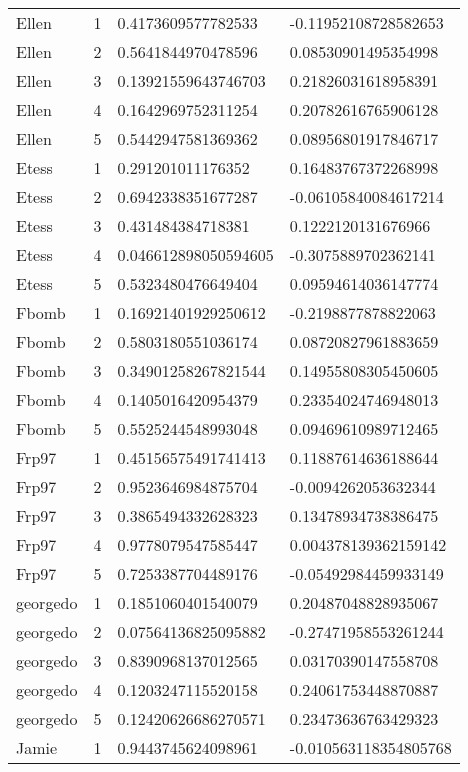 \begin{longtable}{@{}lcll@{}}
      Ellen & 1 & 0.4173609577782533 & -0.11952108728582653 \\
      Ellen & 2 & 0.5641844970478596 & 0.08530901495354998 \\
      Ellen & 3 & 0.13921559643746703 & 0.21826031618958391 \\
      Ellen & 4 & 0.1642969752311254 & 0.20782616765906128 \\
      Ellen & 5 & 0.5442947581369362 & 0.08956801917846717 \\
      Etess & 1 & 0.291201011176352 & 0.16483767372268998 \\
      Etess & 2 & 0.6942338351677287 & -0.06105840084617214 \\
      Etess & 3 & 0.431484384718381 & 0.1222120131676966 \\
      Etess & 4 & 0.046612898050594605 & -0.3075889702362141 \\
      Etess & 5 & 0.5323480476649404 & 0.09594614036147774 \\
      Fbomb & 1 & 0.16921401929250612 & -0.2198877878822063 \\
      Fbomb & 2 & 0.5803180551036174 & 0.08720827961883659 \\
      Fbomb & 3 & 0.34901258267821544 & 0.14955808305450605 \\
      Fbomb & 4 & 0.1405016420954379 & 0.23354024746948013 \\
      Fbomb & 5 & 0.5525244548993048 & 0.09469610989712465 \\
      Frp97 & 1 & 0.45156575491741413 & 0.11887614636188644 \\
      Frp97 & 2 & 0.9523646984875704 & -0.0094262053632344 \\
      Frp97 & 3 & 0.3865494332628323 & 0.13478934738386475 \\
      Frp97 & 4 & 0.9778079547585447 & 0.004378139362159142 \\
      Frp97 & 5 & 0.7253387704489176 & -0.05492984459933149 \\
      georgedo & 1 & 0.1851060401540079 & 0.20487048828935067 \\
      georgedo & 2 & 0.07564136825095882 & -0.27471958553261244 \\
      georgedo & 3 & 0.8390968137012565 & 0.03170390147558708 \\
      georgedo & 4 & 0.1203247115520158 & 0.24061753448870887 \\
      georgedo & 5 & 0.12420626686270571 & 0.23473636763429323 \\
      Jamie & 1 & 0.9443745624098961 & -0.010563118354805768 \\

\end{longtable}
